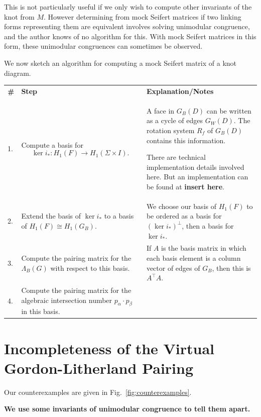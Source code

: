 \documentclass[12pt]{report}
\newcommand{\notered}[1]{{\color{Red} \textbf{#1}}}
\theoremstyle{upright}
\begin{document}
This is not particularly useful if we only wish to compute other invariants of the knot from $M$. However determining from mock Seifert matrices if two linking forms representing them are equivalent involves solving unimodular congruence, and the author knows of no algorithm for this. With mock Seifert matrices in this form, these unimodular congruences can sometimes be observed.

We now sketch an algorithm for computing a mock Seifert matrix of a knot diagram.


{\def\arraystretch{1.6}
\begin{longtable}{p{}p{}p{}}
	\textbf{\#} & \textbf{Step}
	& \textbf{Explanation/Notes}\\
	1.
	& Compute a basis for \[\ker i_{*}: H_{1}(F) \to H_{1}(\Sigma \times I).\]
	& A face in $G_{B}(D)$ can be written as a cycle of edges $G_{W}(D)$. The rotation system $R_{f}$ of $G_{B}(D)$ contains this information.
	
	There are technical implementation details involved here. But an implementation can be found at \notered{insert here}.\\
	2.
	& Extend the basis of $\ker i_{*}$ to a basis of ${H_{1}(F) \cong H_{1}(G_{B})}$.
	& We choose our basis of $H_{1}(F)$ to be ordered as a basis for $(\ker i_{*})^{\perp}$, then a basis for $\ker i_{*}$.\\
	3.
	& Compute the pairing matrix for the $\Lambda_{B}(G)$ with respect to this basis.
	& If $A$ is the basis matrix in which each basis element is a column vector of edges of $G_{B}$, then this is $A^{\top}A$.\\
	4.
	& Compute the pairing matrix for the algebraic intersection number $p_{\alpha} \cdot p_{\beta}$ in this basis.
\end{longtable}
}
\section{Incompleteness of the Virtual Gordon-Litherland Pairing}

Our counterexamples are given in Fig.~\ref{fig:counterexamples}.

\notered{We use some invariants of unimodular congruence to tell them apart.}
\end{document}
